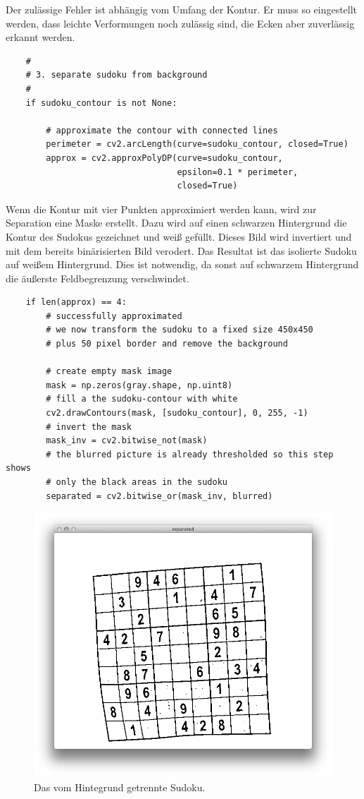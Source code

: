 Der zulässige Fehler ist abhängig vom Umfang der Kontur.
Er muss so eingestellt werden, dass leichte Verformungen noch zulässig sind, die Ecken aber zuverlässig erkannt werden.

\begin{lstlisting}
    #
    # 3. separate sudoku from background
    #
    if sudoku_contour is not None:

        # approximate the contour with connected lines
        perimeter = cv2.arcLength(curve=sudoku_contour, closed=True)
        approx = cv2.approxPolyDP(curve=sudoku_contour,
                                  epsilon=0.1 * perimeter,
                                  closed=True)
\end{lstlisting}

Wenn die Kontur mit vier Punkten approximiert werden kann, wird zur Separation eine Maske erstellt.
Dazu wird auf einen schwarzen Hintergrund die Kontur des Sudokus gezeichnet und weiß gefüllt.
Dieses Bild wird invertiert und mit dem bereits binärisierten Bild verodert.
Das Resultat ist das isolierte Sudoku auf weißem Hintergrund.
Dies ist notwendig, da sonst auf schwarzem Hintergrund die äußerste Feldbegrenzung verschwindet.

\begin{lstlisting}
    if len(approx) == 4:
        # successfully approximated
        # we now transform the sudoku to a fixed size 450x450
        # plus 50 pixel border and remove the background

        # create empty mask image
        mask = np.zeros(gray.shape, np.uint8)
        # fill a the sudoku-contour with white
        cv2.drawContours(mask, [sudoku_contour], 0, 255, -1)
        # invert the mask
        mask_inv = cv2.bitwise_not(mask)
        # the blurred picture is already thresholded so this step shows
        # only the black areas in the sudoku
        separated = cv2.bitwise_or(mask_inv, blurred)
\end{lstlisting}

\begin{figure}[H]
    \begin{center}
        \includegraphics[width=.5\textwidth]{Abbildungen/separated}
    \end{center}
    \caption{Das vom Hintegrund getrennte Sudoku.}
\end{figure}

